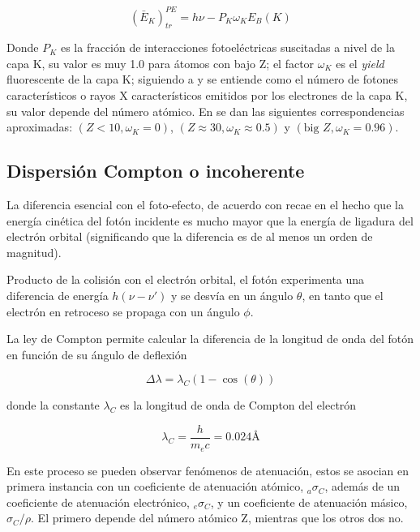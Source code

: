 \documentclass[12pt,letterpaper, oneside]{book}
\begin{document}
	 \begin{equation}
	 	(\bar{E}_K)^{PE}_{tr} = h\nu - P_K \omega_K E_B(K)\label{energia_cinetica_fotoelectrones}
	 \end{equation}
	 
	 Donde $P_K$ es la fracción de interacciones fotoeléctricas suscitadas a nivel de la capa K, su valor es muy 1.0 para átomos con bajo Z; el factor $\omega_K$ es el \textit{yield} fluorescente de la capa K; siguiendo a \cite{IAEA.2005} y \cite{Mayles.2007} se entiende como el número de fotones característicos o rayos X característicos emitidos por los electrones de la capa K, su valor depende del número atómico. En \cite{IAEA.2005} se dan las siguientes correspondencias aproximadas: $(Z<10,\omega_K=0)$, $(Z\approx 30,\omega_K \approx 0.5)$ y $(\textrm{big }Z,\omega_K=0.96)$. 
	 
	 \subsection{Dispersión Compton o incoherente}
	 La diferencia esencial con el foto-efecto, de acuerdo con \cite{IAEA.2005} recae en el hecho que la energía cinética del fotón incidente es mucho mayor que la energía de ligadura del electrón orbital (significando que la diferencia es de al menos un orden de magnitud). 
	 
	 Producto de la colisión con el electrón orbital, el fotón experimenta una diferencia de energía $h(\nu - \nu')$ y se desvía en un ángulo $\theta$, en tanto que el electrón en retroceso se propaga con un ángulo $\phi$. 
	 
	 La ley de Compton permite calcular la diferencia de la longitud de onda del fotón en función de su ángulo de deflexión
	 
	 \begin{equation}
	 	\Delta \lambda = \lambda_C (1 - \cos(\theta)) \label{ley_compton}
	 \end{equation}
	 
	 donde la constante $\lambda_C$ es la longitud de onda de Compton del electrón
	 
	 $$\lambda_C=\frac{h}{m_e c}=0.024 \textrm{\AA}$$
	 
	 En este proceso se pueden observar fenómenos de atenuación, estos se asocian en primera instancia con un coeficiente de atenuación atómico, $_a\sigma_C$, además de un coeficiente de atenuación electrónico, $_e\sigma_C$, y un coeficiente de atenuación másico, $\sigma_C/\rho$. El primero depende del número atómico Z, mientras que los otros dos no\cite{IAEA.2005}.
	 
\end{document}
